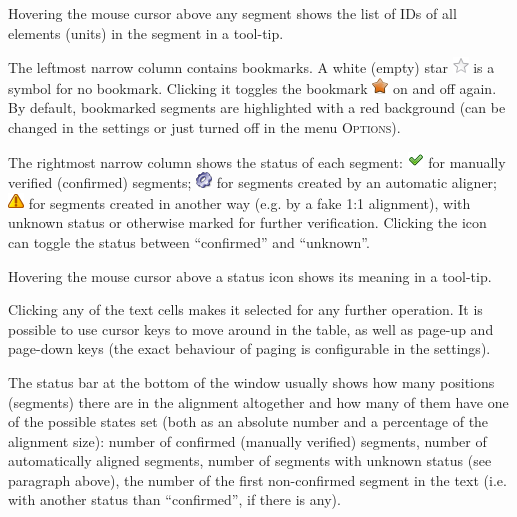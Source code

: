 \documentclass[a4paper,10pt,oneside]{book}
\newcommand{\menu}[1]{\textsc{#1}}
\begin{document}
Hovering the mouse cursor above any segment shows the list of IDs of all elements (units) in the segment in a tool-tip.

The leftmost narrow column contains bookmarks. A white (empty) star \includegraphics[height=1.5ex]{../images/16/nomark.png} is a symbol for no bookmark. Clicking it toggles the bookmark \includegraphics[height=1.5ex]{../images/16/mark.png} on and off again. By default, bookmarked segments are highlighted with a red background (can be changed in the settings or just turned off in the menu \menu{Options}).

The rightmost narrow column shows the status of each segment: \includegraphics[height=1.5ex]{../images/16/confirmed.png} for manually verified (confirmed) segments; \includegraphics[height=1.5ex]{../images/16/automatic.png} for segments created by an automatic aligner; \includegraphics[height=1.5ex]{../images/16/plain.png} for segments created in another way (e.g. by a fake 1:1 alignment), with unknown status or otherwise marked for further verification. Clicking the icon can toggle the status between ``confirmed'' and ``unknown''.

Hovering the mouse cursor above a status icon shows its meaning in a tool-tip.

Clicking any of the text cells makes it selected for any further operation. It is possible to use cursor keys to move around in the table, as well as page-up and page-down keys (the exact behaviour of paging is configurable in the settings).

The status bar at the bottom of the window usually shows how many positions (segments) there are in the alignment altogether and how many of them have one of the possible states set (both as an absolute number and a percentage of the alignment size): number of confirmed (manually verified) segments, number of automatically aligned segments, number of segments with unknown status (see paragraph above), the number of the first non-confirmed segment in the text (i.e. with another status than ``confirmed'', if there is any).
\end{document}
